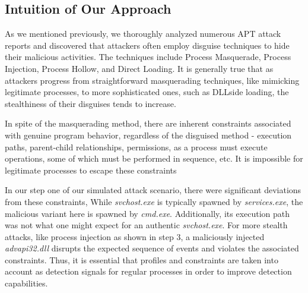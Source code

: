 \subsection{Intuition of Our Approach}
\label{sec:intuition}
As we mentioned previously, we thoroughly analyzed numerous APT attack 
reports\cite{eclecticiq2023,microsoft2023,paloaltonetworks2023} and discovered that attackers often employ disguise techniques to hide their malicious activities. 
The techniques include Process Masquerade, Process Injection, Process Hollow, and Direct Loading.
It is generally true that as attackers progress from straightforward masquerading techniques, like mimicking legitimate processes, to more sophisticated ones, such as DLL\-side loading, the stealthiness of their disguises tends to increase.

In spite of the masquerading method, there are inherent constraints associated with genuine program behavior, regardless of the disguised method - execution paths, parent-child relationships, permissions, as a process must execute operations, some of which must be performed in sequence, etc. It is impossible for legitimate processes to escape these constraints

In our step one of our simulated attack scenario, there were significant deviations from these constraints, While \textit{svchost.exe} is typically spawned by \textit{services.exe}, the malicious variant here is spawned by \textit{cmd.exe}. Additionally, its execution path was not what one might expect for an authentic \textit{svchost.exe}.
For more stealth attacks, like process injection as shown in step 3, a maliciously injected \textit{advapi32.dll} disrupts the expected sequence of events and violates the associated constraints. Thus, it is essential that profiles and constraints are taken into account as detection signals for regular processes in order to improve detection capabilities.




